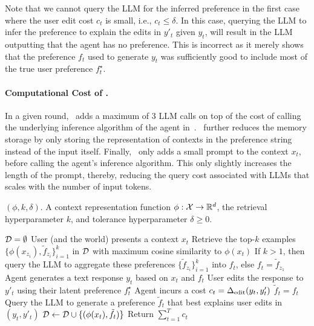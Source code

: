  Note that we cannot query the LLM for the inferred preference in the first case where the user edit cost $c_t$ is small, i.e., $c_t \le \delta$. In this case, querying the LLM to infer the preference to explain the edits in $y'_t$ given $y_t$, will result in the LLM outputting that the agent has no preference. This is incorrect as it merely shows that the preference $f_t$ used to generate $y_t$ was sufficiently good to include most of the true user preference $f^\star_t$.

 \paragraph{Computational Cost of \algname.} In a given round, \algname~adds a maximum of 3 LLM calls on top of the cost of calling the underlying inference algorithm of the agent in~. \algname~further reduces the memory storage by only storing the representation of contexts in the preference string instead of the input itself. Finally, \algname~only adds a small prompt to the context $x_t$, before calling the agent's inference algorithm. This only slightly increases the length of the prompt, thereby, reducing the query cost associated with LLMs that scales with the number of input tokens.

 
 





\begin{algorithm}[h!]
\caption{\algname$(\phi, k, \delta)$. A context representation function $\phi: \mathcal{X} \rightarrow \mathbb{R}^d$, the retrieval hyperparameter $k$, and tolerance hyperparameter $\delta \ge 0$.}
    \begin{algorithmic}[1]
        \State $\mathcal{D} = \emptyset$
        \State User (and the world) presents a context $x_t$
        \State Retrieve the top-$k$ examples $\{\phi(x_{z_i}), \tilde{f}_{z_i}\}_{i=1}^k$ in $\mathcal{D}$ with maximum cosine similarity to $\phi(x_t)$
        \State If $k > 1$, then query the LLM to aggregate these preferences $\{\tilde{f}_{z_i}\}_{i=1}^k$ into $f_t$, else $f_t = \tilde{f}_{z_1}$\label{line:merge_preferences}
        \State Agent generates a text response $y_t$ based on  $x_t$ and $f_t$ \label{line:generate}
        \State User edits the response to $y'_t$ using their latent preference $f^\star_t$
        \State Agent incurs a cost $c_t = \Delta_{\textrm{edit}}(y_t, y'_t)$
        \State $\tilde{f}_t = f_t$
        \Else
        \State Query the LLM to generate a preference $\tilde{f}_t$ that best explains user edits in $(y_t, y'_t)$\label{line:infer_preference}
        \EndIf
        \State $\mathcal{D} \leftarrow \mathcal{D} \cup \{(\phi(x_t), \tilde{f}_t)\}$
        \EndFor
        \State Return $\sum_{t=1}^T c_t$
    \end{algorithmic}
    \label{alg:cipher}
\end{algorithm}







